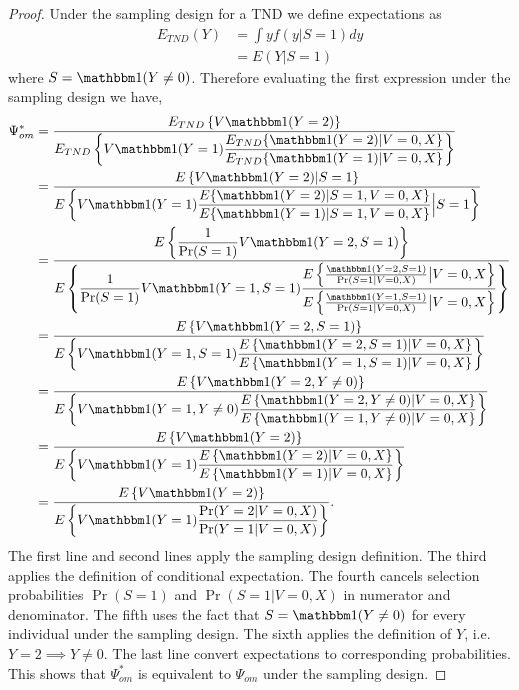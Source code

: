 \begin{appendix}
\begin{refsection}
    \begin{proof}
    Under the sampling design for a TND we define expectations as 
    \begin{align*}
        E_{TND}(Y) &= \int y f(y|S=1)dy \\
        &= E(Y|S=1)
    \end{align*}
    where $S = \mathbbm 1(Y \neq 0)$. Therefore evaluating the first expression under the sampling design we have,
        \begin{align*}
        \Psi^*_{om} &= \dfrac{E_{TND}\left\{V \mathbbm 1(Y = 2)\right\}}{E_{TND}\left\{ V \mathbbm 1(Y=1) \dfrac{E_{TND}\{\mathbbm 1 (Y = 2 )| V = 0, X\} }{E_{TND}\{\mathbbm 1 (Y = 1) | V = 0, X\}}  \right\}} \\
        &=\dfrac{E\left\{V \mathbbm 1(Y = 2) | S = 1\right\}}{E\left\{ V \mathbbm 1(Y=1)  \dfrac{E\{\mathbbm 1 (Y = 2 )| S=1, V = 0, X\} }{E\{\mathbbm 1 (Y = 1) | S= 1, V = 0, X\}}  \Big| S = 1\right\}} \\
        &=\dfrac{E\left\{\dfrac{1}{\Pr(S=1)}V \mathbbm 1(Y = 2, S = 1) \right\}}{E\left\{\dfrac{1}{\Pr(S=1)} V \mathbbm 1(Y=1, S=1)  \dfrac{E\left\{\frac{\mathbbm 1 (Y = 2, S=1 )}{\Pr(S=1|V=0,X)} \big| V = 0, X\right\} }{E\left\{\frac{\mathbbm 1 (Y = 1, S=1 )}{\Pr(S=1|V=0,X)} \big| V = 0, X\right\} }  \right\}} \\
        &=\dfrac{E\left\{V \mathbbm 1(Y = 2, S = 1) \right\}}{E\left\{ V \mathbbm 1(Y=1, S=1)  \dfrac{E\left\{\mathbbm 1 (Y = 2, S=1 ) | V = 0, X\right\} }{E\left\{\mathbbm 1 (Y = 1, S=1 ) | V = 0, X\right\}  }  \right\}} \\
        &=\dfrac{E\left\{V \mathbbm 1(Y = 2, Y\neq0) \right\}}{E\left\{ V \mathbbm 1(Y=1, Y\neq0)  \dfrac{E\left\{\mathbbm 1 (Y = 2, Y\neq0 ) | V = 0, X\right\} }{E\left\{\mathbbm 1 (Y = 1, Y\neq0 ) | V = 0, X\right\}  }  \right\}} \\
        &=\dfrac{E\left\{V \mathbbm 1(Y = 2) \right\}}{E\left\{ V \mathbbm 1(Y=1)  \dfrac{E\left\{\mathbbm 1 (Y = 2 ) | V = 0, X\right\} }{E\left\{\mathbbm 1 (Y = 1) | V = 0, X\right\}  }  \right\}} \\
        &=\dfrac{E\left\{V \mathbbm 1(Y = 2) \right\}}{E\left\{ V \mathbbm 1(Y=1)  \dfrac{\Pr(Y = 2  | V = 0, X) }{\Pr(Y = 1 | V = 0, X)  }  \right\}}.
    \end{align*}
    The first line and second lines apply the sampling design definition. The third applies the definition of conditional expectation. The fourth cancels selection probabilities $\Pr(S=1)$ and $\Pr(S=1|V=0,X)$ in numerator and denominator. The fifth uses the fact that $S = \mathbbm 1(Y \neq 0)$ for every individual under the sampling design. The sixth applies the definition of $Y$, i.e. $Y = 2 \implies Y \neq 0$. The last line convert expectations to corresponding probabilities. This shows that $\Psi^*_{om}$ is equivalent to $\Psi_{om}$ under the sampling design.
    

\end{proof}
\end{refsection}
\end{appendix}
